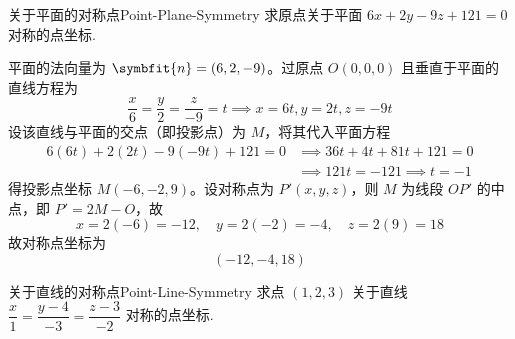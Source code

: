 \begin{problem}{关于平面的对称点}{Point-Plane-Symmetry}
    求原点关于平面 $6x + 2y - 9z + 121 = 0$ 对称的点坐标.
\end{problem}

\begin{solution}
    平面的法向量为 $\symbfit{n} = (6, 2, -9)$。过原点 $O(0, 0, 0)$ 且垂直于平面的直线方程为
    \begin{equation*}
        \frac{x}{6} = \frac{y}{2} = \frac{z}{-9} = t \implies x = 6t, y = 2t, z = -9t
    \end{equation*}
    设该直线与平面的交点（即投影点）为 $M$，将其代入平面方程
    \begin{equation*}
        \begin{aligned}
            6(6t) + 2(2t) - 9(-9t) + 121 = 0
             & \implies 36t + 4t + 81t + 121 = 0    \\
             & \implies 121t = -121 \implies t = -1
        \end{aligned}
    \end{equation*}
    得投影点坐标 $M(-6, -2, 9)$。设对称点为 $P'(x, y, z)$，则 $M$ 为线段 $OP'$ 的中点，即 $P' = 2M - O$，故
    \begin{equation*}
        x = 2(-6) = -12, \quad y = 2(-2) = -4, \quad z = 2(9) = 18
    \end{equation*}
    故对称点坐标为
    \begin{equation*}
        \boxed{(-12, -4, 18)}
    \end{equation*}
\end{solution}


\begin{problem}{关于直线的对称点}{Point-Line-Symmetry}
    求点 $(1, 2, 3)$ 关于直线 $\dfrac{x}{1} = \dfrac{y-4}{-3} = \dfrac{z-3}{-2}$ 对称的点坐标.
\end{problem}

